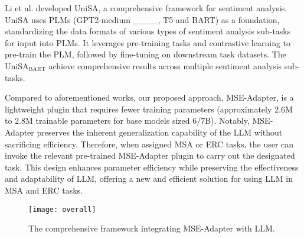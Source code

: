 	Li et al.  developed UniSA, a comprehensive framework for sentiment analysis. UniSA uses PLMs (GPT2-medium ____, T5 and BART) as a foundation, standardizing the data formats of various types of sentiment analysis sub-tasks for input into PLMs. It leverages pre-training tasks and contrastive learning to pre-train the PLM, followed by fine-tuning on downstream task datasets. The UniSA$_{\text{BART}}$ achieve comprehensive results across multiple sentiment analysis sub-tasks. 
	
	Compared to aforementioned works, our proposed approach, MSE-Adapter, is a lightweight plugin that requires fewer training parameters (approximately 2.6M to 2.8M trainable parameters for base models sized 6/7B). Notably, MSE-Adapter preserves the inherent generalization capability of the LLM without sacrificing efficiency. Therefore, when assigned MSA or ERC tasks, the user can invoke the relevant pre-trained MSE-Adapter plugin to carry out the designated task. This design enhances parameter efficiency while preserving the effectiveness and adaptability of LLM, offering a new and efficient solution for using LLM in MSA and ERC tasks.
		
	\begin{figure*}[ht]
		\centering
		\texttt{[image: overall]}
		\caption{The comprehensive framework integrating MSE-Adapter with LLM.} %
		\label{figure 1}
	\end{figure*}
	
